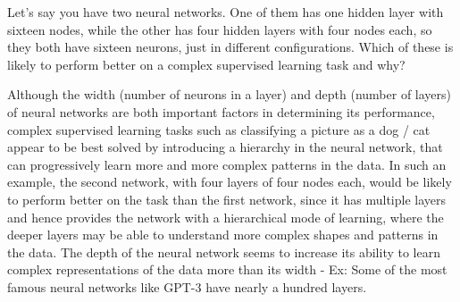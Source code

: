 	\begin{qanda}
		\begin{question}
Let's say you have two neural networks. One of them has one hidden layer with sixteen nodes, while the other has four hidden layers with four nodes each, so they both have sixteen neurons, just in different configurations. Which of these is likely to perform better on a complex supervised learning task and why?
		\end{question}
		\begin{answer}
Although the width (number of neurons in a layer) and depth (number of layers) of neural networks are both important factors in determining its performance, complex supervised learning tasks such as classifying a picture as a dog / cat appear to be best solved by introducing a hierarchy in the neural network, that can progressively learn more and more complex patterns in the data. In such an example, the second network, with four layers of four nodes each, would be likely to perform better on the task than the first network, since it has multiple layers and hence provides the network with a hierarchical mode of learning, where the deeper layers may be able to understand more complex shapes and patterns in the data. The depth of the neural network seems to increase its ability to learn complex representations of the data more than its width - Ex: Some of the most famous neural networks like GPT-3 have nearly a hundred layers.
		\end{answer}
	\end{qanda}

